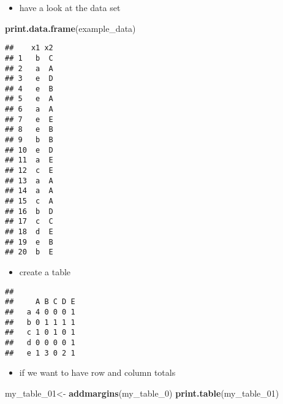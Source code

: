 \documentclass[
]{article}
\newenvironment{Shaded}{\begin{snugshade}}{\end{snugshade}}
\newcommand{\DecValTok}[1]{\textcolor[rgb]{0.00,0.00,0.81}{#1}}
\newcommand{\KeywordTok}[1]{\textcolor[rgb]{0.13,0.29,0.53}{\textbf{#1}}}
\newcommand{\NormalTok}[1]{#1}
\newcommand{\OperatorTok}[1]{\textcolor[rgb]{0.81,0.36,0.00}{\textbf{#1}}}
\newcommand{\StringTok}[1]{\textcolor[rgb]{0.31,0.60,0.02}{#1}}
\providecommand{\tightlist}{%
  \setlength{\itemsep}{0pt}\setlength{\parskip}{0pt}}
\begin{document}
\begin{itemize}
\tightlist
\item
  have a look at the data set
\end{itemize}

\begin{Shaded}
\begin{Highlighting}[]
\KeywordTok{print.data.frame}\NormalTok{(example_data)}
\end{Highlighting}
\end{Shaded}

\begin{verbatim}
##    x1 x2
## 1   b  C
## 2   a  A
## 3   e  D
## 4   e  B
## 5   e  A
## 6   a  A
## 7   e  E
## 8   e  B
## 9   b  B
## 10  e  D
## 11  a  E
## 12  c  E
## 13  a  A
## 14  a  A
## 15  c  A
## 16  b  D
## 17  c  C
## 18  d  E
## 19  e  B
## 20  b  E
\end{verbatim}

\begin{itemize}
\tightlist
\item
  create a table
\end{itemize}

\begin{Shaded}
\end{Shaded}

\begin{verbatim}
##    
##     A B C D E
##   a 4 0 0 0 1
##   b 0 1 1 1 1
##   c 1 0 1 0 1
##   d 0 0 0 0 1
##   e 1 3 0 2 1
\end{verbatim}

\begin{itemize}
\tightlist
\item
  if we want to have row and column totals
\end{itemize}

\begin{Shaded}
\begin{Highlighting}[]
\NormalTok{my_table_}\DecValTok{01}\NormalTok{<-}\StringTok{ }\KeywordTok{addmargins}\NormalTok{(my_table_}\DecValTok{0}\NormalTok{)}
\KeywordTok{print.table}\NormalTok{(my_table_}\DecValTok{01}\NormalTok{)}
\end{Highlighting}
\end{Shaded}
\end{document}
